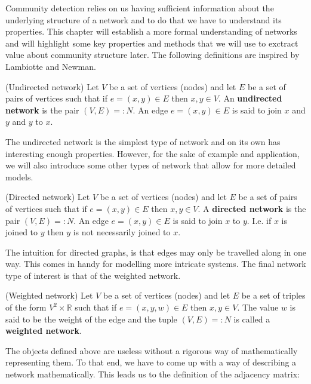 Community detection relies on us having sufficient information about the underlying structure of a network and to do that we have to understand its properties. This chapter will establish a more formal understanding of networks and will highlight some key properties and methods that we will use to exctract value about community structure later. The following definitions are inspired by Lambiotte\cite{oxford:renaud_notes} and Newman\cite{newman10}.

\begin{definition}{(Undirected network)}
    Let $V$ be a set of vertices (nodes) and let $E$ be a set of pairs of vertices such that if $e = (x, y) \in E$ then $x, y \in V$. An \textbf{undirected network} is the pair $(V, E) =: N$. An edge $e = (x, y) \in E$ is said to join $x$ and $y$ and $y$ to $x$\label{def:undirected_network}.
\end{definition}

The undirected network is the simplest type of network and on its own has interesting enough properties. However, for the sake of example and application, we will also introduce some other types of network that allow for more detailed models.

\begin{definition}{(Directed network)}
    Let $V$ be a set of vertices (nodes) and let $E$ be a set of pairs of vertices such that if $e = (x, y) \in E$ then $x, y \in V$. A \textbf{directed network} is the pair $(V, E) =: N$. An edge $e = (x, y) \in E$ is said to join $x$ to $y$. I.e. if $x$ is joined to $y$ then $y$ is not necessarily joined to $x$\label{def:directed_network}.
\end{definition}

The intuition for directed graphs, is that edges may only be travelled along in one way. This comes in handy for modelling more intricate systems. The final network type of interest is that of the weighted network.

\begin{definition}{(Weighted network)}
    Let $V$ be a set of vertices (nodes) and let $E$ be a set of triples of the form $V^2 \times \mathbb{R}$ such that if $e = (x, y, w) \in E$ then $x, y \in V$. The value $w$ is said to be the weight of the edge and the tuple $(V, E) =: N$ is called a \textbf{weighted network}\label{def:weighted_network}.
\end{definition}

The objects defined above are useless without a rigorous way of mathematically representing them. To that end, we have to come up with a way of describing a network mathematically. This leads us to the definition of the adjacency matrix:

